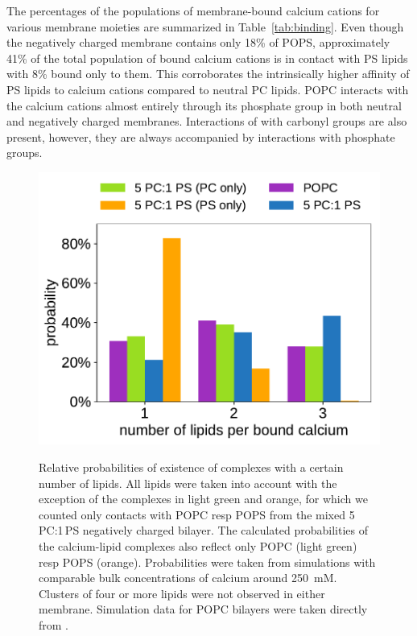\documentclass[journal=jpcbfk,manuscript=article]{achemso}
\newlength{\figwidth}
\begin{document}
The percentages of the populations of membrane-bound calcium cations for various membrane moieties 
are summarized in Table~\ref{tab:binding}.
Even though the negatively charged membrane contains only 18\% of POPS, 
approximately 41\% of the total population of bound calcium cations is in contact with PS lipids
with 8\% bound only to them. 
This corroborates the intrinsically higher affinity of PS lipids to calcium cations compared to neutral PC lipids. 
POPC interacts with the calcium cations almost entirely through its phosphate group 
in both neutral and negatively charged membranes. 
Interactions of  with carbonyl groups are also present, 
however, they are always accompanied by interactions with phosphate groups. 



\begin{figure}[tb!] 
  \centering 
  \includegraphics[width=\figwidth]{../img/stoichiometry_CaCl2_comparison_Ecc-lipids_PC-vs-PCPS.pdf} \\ 
  \caption{\label{fig:cacl_complexes} 
      Relative probabilities of existence of  complexes 
      with a certain number of lipids.  
      All lipids were taken into account with the exception of the complexes in light green and orange, 
      for which we counted only contacts with POPC resp POPS from the mixed 5\,PC:1\,PS negatively charged bilayer. 
      The calculated probabilities of the calcium-lipid complexes also reflect only POPC (light green) resp POPS (orange). 
      Probabilities were taken from simulations with comparable bulk concentrations of calcium around 250~mM. 
      Clusters of four or more lipids were not observed in either membrane. 
      Simulation data for POPC bilayers were taken directly from \cite{melcr18}. 
  } 
\end{figure} 
\end{document}
